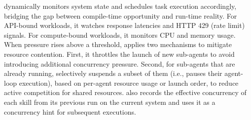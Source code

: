 \sys dynamically monitors system state and schedules task execution accordingly,
bridging the gap between compile-time opportunity and run-time reality.
For API-bound workloads, it watches response latencies and HTTP 429 (rate limit) signals.
For compute-bound workloads, it monitors CPU and memory usage.
When pressure rises above a threshold, 
\sys applies two mechanisms to mitigate resource contention.
First, it throttles the launch of new sub-agents to avoid introducing additional concurrency pressure.
Second, for sub-agents that are already running, \sys selectively suspends a subset of them (i.e., pauses their agent-loop execution), based on per-agent resource usage or launch order, to reduce active competition for shared resources.
\sys also records the effective concurrency of each skill from its previous run on the current system and uses it as a concurrency hint for subsequent executions.


